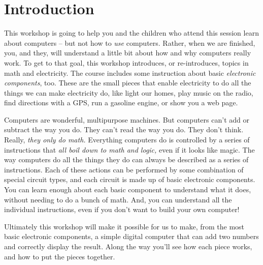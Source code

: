 \section{Introduction}

This workshop is going to help you and the children who attend this session learn about computers -- but not how to \emph{use} computers. Rather, when we are finished, you, and they, will understand a little bit about how and why computers really work. To get to that goal, this workshop introduces, or re-introduces, topics in math and electricity. The course includes some instruction  about basic \emph{electronic components}, too. These are the small pieces that enable electricity to do all the things we can make electricity do, like light our homes, play music on the radio, find directions with a GPS, run a gasoline engine, or show you a web page.

Computers are wonderful, multipurpose machines. But computers can't add or subtract the way you do. They can't read the way you do. They don't think. Really,  \emph{they only do math.} Everything computers do is controlled by a series of instructions that \emph{all boil down to math and logic,} even if it looks like magic. The way computers do all the things they do can always be described as a  series of instructions. Each of these actions can be performed by some combination of special circuit types, and each circuit is made up of basic electronic components. You can learn enough about each basic component to understand what it does, without needing to do a bunch of math. And, you can understand all the individual instructions, even if you don't want to build your own computer!

Ultimately this workshop will make it possible for us to make, from the most basic electronic components, a simple digital computer that can add two numbers and correctly display the result. Along the way you'll see how each piece works, and how to put the pieces together. 


